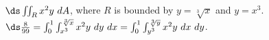 {$\ds \iint_R x^2y\ dA$, where $R$ is bounded by $y=\sqrt[3]{x}$ and $y=x^3$.
}
{$\ds \frac8{99} = \int_0^1\int_{x^3}^{\sqrt[3]{x}}x^2y\ dy\ dx = \int_0^1\int_{y^3}^{\sqrt[3]{y}}x^2y\ dx\ dy$.
}